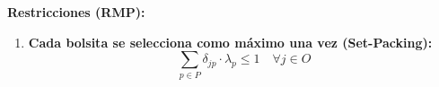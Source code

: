 \documentclass[a4paper,12pt]{article}
\begin{document}
\textbf{Restricciones (RMP):}
\begin{enumerate}
    \item \textbf{Cada bolsita se selecciona como máximo una vez (Set-Packing):}
    \[ \sum_{p \in P} \delta_{jp} \cdot \lambda_p \le 1 \quad \forall j \in O \]

\end{enumerate}
\end{document}
